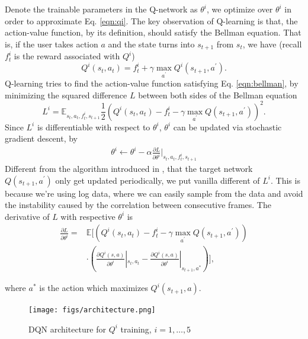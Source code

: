 \documentclass{sigchi}
\begin{document}
Denote the trainable parameters in the Q-network as $\theta^i$, we optimize over $\theta^i$ in order to approximate Eq. \eqref{eqn:qi}.
The key observation of Q-learning is that, the action-value function, by its definition, should satisfy the Bellman equation.
That is, if the user takes action $a$ and the state turns into $s_{t+1}$ from $s_t$, we have (recall $f_t^i$ is the reward associated with $Q^i$)
\begin{equation}
Q^i(s_t,a_t)=f_t^i + \gamma \max_{a^\prime}Q^i(s_{t+1}, a^\prime). \label{eqn:bellman}
\end{equation}
Q-learning tries to find the action-value function satisfying Eq. \eqref{eqn:bellman}, by minimizing the squared difference $L$ between both sides of the Bellman equation
\begin{equation*}
L^i=\mathbb{E}_{s_t, a_t, f_t^i, s_{t+1}} \frac{1}{2}(Q^i(s_t,a_t)- f_t^i - \gamma\max_{a^\prime}Q(s_{t+1}, a^\prime))^2.
\end{equation*}
Since $L^i$ is differentiable with respect to $\theta^i$, $\theta^i$ can be updated via stochastic gradient descent, by
\begin{eqnarray*}
\theta^i \leftarrow \theta^i - \alpha\frac{\partial L}{\partial \theta^i}\Big|_{s_t, a_t, f_t^i, s_{t+1}}
\end{eqnarray*}
Different from the algorithm introduced in \cite{mnih2015human}, that the target network $Q(s_{t+1}, a^\prime)$ only get updated periodically, we put vanilla different of $L^i$. 
This is because we're using log data, where we can easily sample from the data and avoid the instability caused by the correlation between consecutive frames.
The derivative of $L$ with respective $\theta^i$ is
\begin{equation*}
\begin{aligned}
\frac{\partial L}{\partial \theta^i} = & \mathbb{E}\Big[ (Q^i(s_t,a_t)- f_t^i - \gamma\max_{a^\prime}Q(s_{t+1}, a^\prime)) \\
& \cdot (\frac{\partial{Q^i(s,a)}}{\partial{\theta^i}}|_{s_t,a_t} - \frac{\partial{Q^i(s,a)}}{\partial{\theta^i}}|_{{s_{t+1},a^\ast}})\Big],
\end{aligned}
\end{equation*}

where $a^\ast$ is the action which maximizes $Q^i(s_{t+1},a)$.

\begin{figure}[t]
  \centering
  \texttt{[image: figs/architecture.png]}
  \caption{DQN architecture for $Q^i$ training, $i=1, \dots,5$}
  \label{fig:architecture}
\end{figure}
\end{document}
